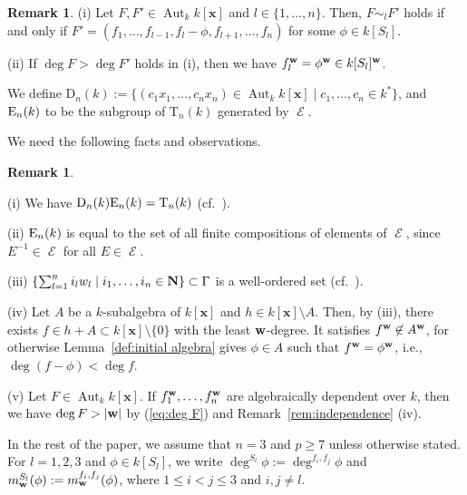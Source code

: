 \documentclass{amsart}
\theoremstyle{plain}
\theoremstyle{definition}
\newtheorem{rem}[thm]{Remark}
\newcommand{\E }{{\mathop{\mathcal{E}}\nolimits}}
\newcommand{\zs}{\{ 0\} }
\newcommand{\sm}{\setminus}
\newcommand{\Aut }{\mathop{\mathrm{Aut}}\nolimits}
\newcommand{\T }{\mathrm{T}}
\newcommand{\D }{\mathrm{D}}
\newcommand{\nd}{\noindent}
\newcommand{\N}{{\bf N}}
\newcommand{\x}{{\boldsymbol x}}
\newcommand{\w}{{\bf w}}
\newcommand{\kx}{k[\x]}
\newcommand{\degw  }{\deg}
\begin{document}
\begin{rem}\label{rem:sim}\rm 
(i) 
Let $F,F'\in \Aut _k\kx $ and $l\in \{ 1,\ldots ,n\} $. 
Then, 
$F\sim _lF'$ holds if and only if 
$F'=(f_1,\ldots ,f_{l-1},f_l-\phi ,f_{l+1},\ldots ,f_n)$ 
for some $\phi \in k[S_l]$. 

\nd (ii) 
If $\deg F>\deg F'$ holds in (i), 
then we have $f_l^{\w }=\phi ^{\w }\in k[S_l]^{\w }$. 
\end{rem}



We define 
$\D _n(k):=\{ (c_1x_1,\ldots ,c_nx_n)\in \Aut _k\kx 
\mid c_1,\ldots ,c_n\in k^*\} $, 
and ${\rm E}_n(k)$ to be the subgroup of $\T _n(k)$ generated by $\E $. 


We need the following facts and observations. 



\begin{rem}\label{rem:ch2}\rm 


\nd (i) 
We have $\D_n(k){\rm E}_n(k)=\T _n(k)$ 
(cf.\ \cite[\S 1.1.1, Exercise 2]{JC}). 


\nd (ii) ${\rm E}_n(k)$ is equal to the set of all finite compositions of 
elements of $\E $, 
since $E^{-1}\in \E $ for all $E\in \E $. 



\nd (iii) 
$\{ \sum _{l=1}^ni_lw_l \mid i_1,\ldots ,i_n\in \N \} \subset \Gamma $ 
is a well-ordered set 
(cf.~\cite[Lemma 1.1.12]{JC}). 



\nd (iv) 
Let $A$ be a $k$-subalgebra of $\kx $ 
and $h\in \kx \sm A$. 
Then, by (iii), 
there exists $f\in h+A\subset \kx \sm \zs $ with the least $\w $-degree. 
It satisfies $f^{\w }\not\in A^{\w }$, 
for otherwise Lemma~\ref{def:initial algebra} gives 
$\phi \in A$ such that $f^{\w }=\phi ^{\w }$, 
i.e., 
$\deg (f-\phi )<\deg f$. 



\nd (v) 
Let $F\in \Aut _k\kx $. 
If $f_1^{\w },\ldots ,f_n^{\w }$ are algebraically dependent over $k$, 
then we have $\deg F>|\w |$ 
by (\ref{eq:deg F}) and Remark~\ref{rem:independence} (iv).  
\end{rem}



In the rest of the paper, 
we assume that $n=3$ and $p\ge 7$ unless otherwise stated. 
For $l=1,2,3$ and $\phi \in k[S_l]$, 
we write 
$\degw ^{S_l}\phi :=\degw ^{f_i,f_j}\phi $ and 
$m_{\w }^{S_l}(\phi ):=m_{\w }^{f_i,f_j}(\phi )$, 
where $1\le i<j\le 3$ and $i,j\ne l$. 
\end{document}
